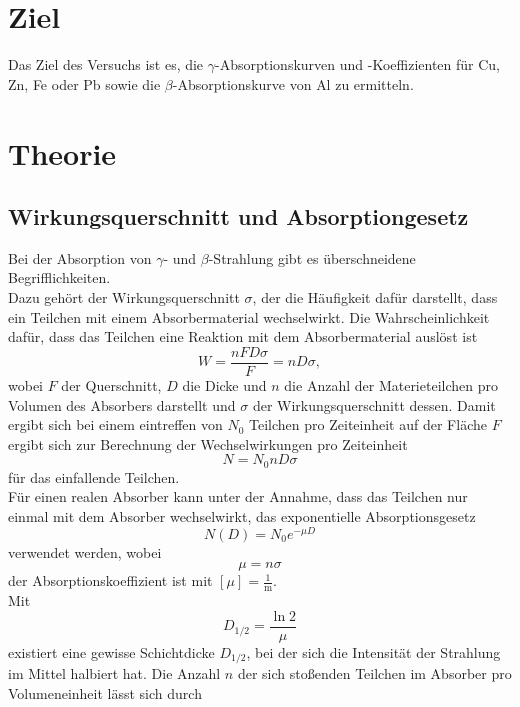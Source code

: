 \section{Ziel}
Das Ziel des Versuchs ist es, die $\gamma$-Absorptionskurven und -Koeffizienten für Cu, Zn, Fe oder Pb sowie die $\beta$-Absorptionskurve von Al zu ermitteln.

\section{Theorie}
\label{sec:Theorie}
\subsection{Wirkungsquerschnitt und Absorptiongesetz}
Bei der Absorption von $\gamma$- und $\beta$-Strahlung gibt es überschneidene Begrifflichkeiten.\\
Dazu gehört der Wirkungsquerschnitt $\sigma$, der die Häufigkeit dafür darstellt, dass ein Teilchen mit einem Absorbermaterial wechselwirkt. Die Wahrscheinlichkeit dafür, dass das Teilchen eine Reaktion mit dem Absorbermaterial auslöst ist
\begin{equation*}
  W=\frac{nFD\sigma}{F}=nD\sigma,
\end{equation*}
wobei $F$ der Querschnitt, $D$ die Dicke und $n$ die Anzahl der Materieteilchen pro Volumen des Absorbers darstellt und $\sigma$ der Wirkungsquerschnitt dessen. 
Damit ergibt sich bei einem eintreffen von $N_0$ Teilchen pro Zeiteinheit auf der Fläche $F$ ergibt sich zur Berechnung der Wechselwirkungen pro Zeiteinheit 
\begin{equation*}
  N=N_0 nD\sigma
\end{equation*}
für das einfallende Teilchen.\\
Für einen realen Absorber kann unter der Annahme, dass das Teilchen nur einmal mit dem Absorber wechselwirkt, das exponentielle Absorptionsgesetz
\begin{equation}
  N(D)=N_0 e^{-\mu D}
  \label{eq:1}
\end{equation}
verwendet werden, wobei 
\begin{equation}
  \mu=n\sigma
  \label{eq:2}
\end{equation}
der Absorptionskoeffizient ist mit $[\mu]=\frac{1}{\textrm{m}}$.\\
Mit 
\begin{equation*}
  D_{1/2}=\frac{\ln{2}}{\mu}
\end{equation*}
existiert eine gewisse Schichtdicke $D_{1/2}$, bei der sich die Intensität der Strahlung im Mittel halbiert hat. Die Anzahl $n$ der sich stoßenden Teilchen im Absorber pro Volumeneinheit lässt sich durch
